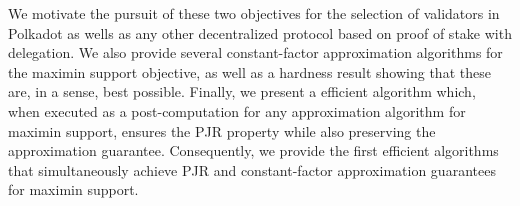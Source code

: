 We motivate the pursuit of these two objectives for the selection of validators in Polkadot as wells as any other decentralized protocol based on proof of stake with delegation. We also provide several constant-factor approximation algorithms for the maximin support objective, as well as a hardness result showing that these are, in a sense, best possible. Finally, we present a efficient algorithm which, when executed as a post-computation for any approximation algorithm for maximin support, ensures the PJR property while also preserving the approximation guarantee. Consequently, we provide the first efficient algorithms that simultaneously achieve PJR and constant-factor approximation guarantees for maximin support. 